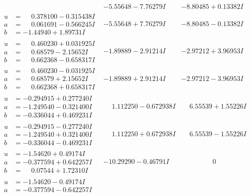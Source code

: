 \documentclass[1p]{elsarticle_modified}
\theoremstyle{definition}
\begin{document}
$$\begin{array}{c|c|c}
 & -5.55648 - 7.76279 I & -8.80485 + 0.13382 I \\ \hline\begin{aligned}
u &= \phantom{-}0.378100 - 0.315438 I \\
a &= \phantom{-}0.061691 - 0.566245 I \\
b &= -1.44940 + 1.89731 I\end{aligned}
 & -5.55648 + 7.76279 I & -8.80485 - 0.13382 I \\ \hline\begin{aligned}
u &= \phantom{-}0.460230 + 0.031925 I \\
a &= \phantom{-}0.68579 - 2.15652 I \\
b &= \phantom{-}0.662368 - 0.658317 I\end{aligned}
 & -1.89889 - 2.91214 I & -2.97212 + 3.96953 I \\ \hline\begin{aligned}
u &= \phantom{-}0.460230 - 0.031925 I \\
a &= \phantom{-}0.68579 + 2.15652 I \\
b &= \phantom{-}0.662368 + 0.658317 I\end{aligned}
 & -1.89889 + 2.91214 I & -2.97212 - 3.96953 I \\ \hline\begin{aligned}
u &= -0.294915 + 0.277240 I \\
a &= -1.249540 - 0.321400 I \\
b &= -0.336044 + 0.469231 I\end{aligned}
 & \phantom{-}1.112250 - 0.672938 I & \phantom{-}6.55539 + 1.55226 I \\ \hline\begin{aligned}
u &= -0.294915 - 0.277240 I \\
a &= -1.249540 + 0.321400 I \\
b &= -0.336044 - 0.469231 I\end{aligned}
 & \phantom{-}1.112250 + 0.672938 I & \phantom{-}6.55539 - 1.55226 I \\ \hline\begin{aligned}
u &= -1.54620 + 0.49174 I \\
a &= -0.377594 + 0.642257 I \\
b &= \phantom{-}0.07544 + 1.72310 I\end{aligned}
 & -10.29290 - 0.46791 I & \phantom{-0.000000 } 0 \\ \hline\begin{aligned}
u &= -1.54620 - 0.49174 I \\
a &= -0.377594 - 0.642257 I \\

\end{aligned}
\end{array}$$
\end{document}
